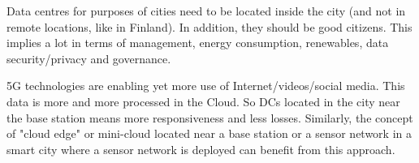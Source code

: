 Data centres for purposes of cities need to be located inside the city (and not in remote locations, like in Finland). In addition, they should be good citizens. This implies a lot in terms of management, energy consumption, renewables, data security/privacy and governance.

5G technologies are enabling yet more use of Internet/videos/social media. This data is more and more processed in the Cloud. So DCs located in the city near the base station means more responsiveness and less losses. Similarly, the concept of "cloud edge" or mini-cloud located near a base station or a sensor network in a smart city where a sensor network is deployed can benefit from this approach. %